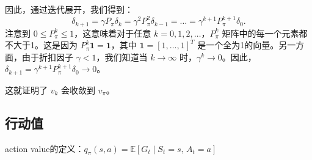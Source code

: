 \documentclass{article}
\begin{document}
因此，通过迭代展开，我们得到：
\[
\delta_{k+1} = \gamma P_{\pi} \delta_k = \gamma^2 P_{\pi}^2 \delta_{k-1} = \dots = \gamma^{k+1} P_{\pi}^{k+1} \delta_0.
\]
注意到 $0 \le P_{\pi}^k \le 1$，这意味着对于任意 $k=0, 1, 2, \dots$，$P_{\pi}^k$ 矩阵中的每一个元素都不大于1。这是因为 $P_{\pi}^k \mathbf{1} = \mathbf{1}$，其中 $\mathbf{1} = [1, \dots, 1]^T$ 是一个全为1的向量。另一方面，由于折扣因子 $\gamma < 1$，我们知道当 $k \to \infty$ 时，$\gamma^k \to 0$。因此，$\delta_{k+1} = \gamma^{k+1} P_{\pi}^{k+1} \delta_0 \to 0$。

这就证明了 $v_k$ 会收敛到 $v_{\pi}$。 
\subsection{行动值}
action value的定义：$q_{\pi}(s, a) = \mathbb{E} \left[ G_t \mid S_t = s,\, A_t = a \right]$
\end{document}
